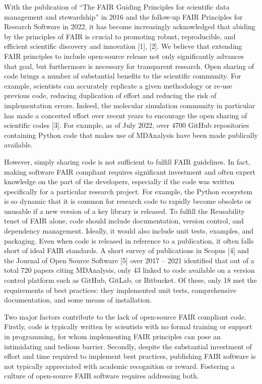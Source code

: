 \documentclass{article}
\begin{document}
With the publication of “The FAIR Guiding Principles for scientific data management and stewardship” in 2016 and the follow-up FAIR Principles for Research Software in 2022, it has become increasingly acknowledged that abiding by the principles of FAIR is crucial to promoting robust, reproducible, and efficient scientific discovery and innovation [1], [2]. We believe that extending FAIR principles to include open-source release not only significantly advances that goal, but furthermore is necessary for transparent research. Open sharing of code brings a number of substantial benefits to the scientific community. For example, scientists can accurately replicate a given methodology or re-use previous code, reducing duplication of effort and reducing the risk of implementation errors. Indeed, the molecular simulation community in particular has made a concerted effort over recent years to encourage the open sharing of scientific codes [3]. For example, as of July 2022, over 4700 GitHub repositories containing Python code that makes use of MDAnalysis have been made publically available.

However, simply sharing code is not sufficient to fulfill FAIR guidelines. In fact, making software FAIR compliant requires significant investment and often expert knowledge on the part of the developers, especially if the code was written specifically for a particular research project. For example, the Python ecosystem is so dynamic that it is common for research code to rapidly become obsolete or unusable if a new version of a key library is released. To fulfill the Reusability tenet of FAIR alone, code should include documentation, version control, and dependency management. Ideally, it would also include unit tests, examples, and packaging. Even when code is released in reference to a publication, it often falls short of ideal FAIR standards. A short survey of publications in Scopus [4] and the Journal of Open Source Software [5] over 2017 – 2021 identified that out of a total 720 papers citing MDAnalysis, only 43 linked to code available on a version control platform such as GitHub, GitLab, or Bitbucket. Of these, only 18 met the requirements of best practices: they implemented unit tests, comprehensive documentation, and some means of installation.

Two major factors contribute to the lack of open-source FAIR compliant code. Firstly, code is typically written by scientists with no formal training or support in programming, for whom implementing FAIR principles can pose an intimidating and tedious barrier. Secondly, despite the substantial investment of effort and time required to implement best practices, publishing FAIR software is not typically appreciated with academic recognition or reward. Fostering a culture of open-source FAIR software requires addressing both.
\end{document}
